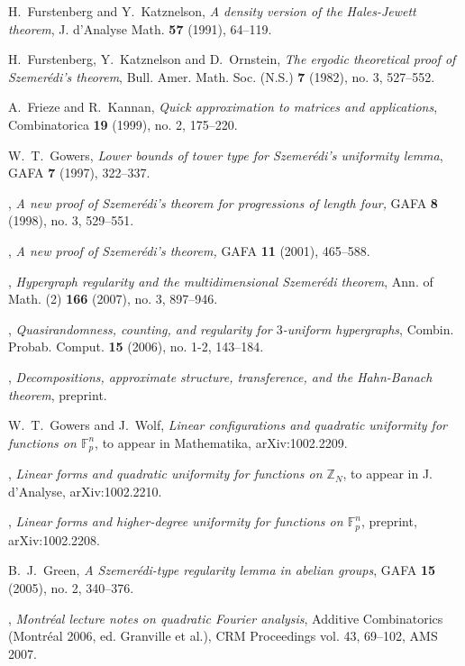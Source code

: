 \documentclass[11pt,reqno]{amsart}
\numberwithin{equation}{section}
\theoremstyle{plain}
\theoremstyle{definition}
\newcommand\F{\mathbb{F}}
\newcommand\1{{\bf 1}}
\newcommand\2{{\bf 2}}
\begin{document}
\begin{thebibliography}{99}
H.~Furstenberg and Y.~Katznelson, \emph{A density version of the Hales-Jewett theorem}, J. d'Analyse Math. \textbf{57} (1991), 64--119.

 H.~Furstenberg, Y.~Katznelson and D.~Ornstein,
\emph{The ergodic theoretical proof of Szemer\'edi's theorem},
Bull. Amer. Math. Soc. (N.S.) \textbf{7} (1982), no. 3, 527--552.

A.~Frieze and R.~Kannan, \emph{Quick approximation to matrices
and applications}, Combinatorica \textbf{19} (1999), no. 2,
175--220.

W.~T.~Gowers, \emph{Lower bounds of tower type for Szemer\'edi's uniformity lemma}, GAFA \textbf{7} (1997), 322--337.

\bysame, \emph{A new proof of Szemer\'edi's theorem for progressions of length four,} GAFA \textbf{8} (1998), 
no. 3, 529--551.

\bysame, \emph{A new proof of Szemer\'edi's theorem,} GAFA \textbf{11} (2001), 465--588. 

\bysame, \emph{Hypergraph regularity and the multidimensional Szemer\'edi theorem}, Ann. of Math. (2) \textbf{166} (2007), no. 3, 897--946.

\bysame, \emph{Quasirandomness, counting, and regularity for $3$-uniform hypergraphs}, Combin. Probab. Comput. \textbf{15} (2006), no. 1-2, 143--184.

\bysame, \emph{Decompositions, approximate structure, transference, and the Hahn-Banach theorem}, preprint.

W.~T.~Gowers and J.~Wolf, \emph{Linear configurations and quadratic uniformity for functions on $\F_p^n$}, to appear in Mathematika, arXiv:1002.2209.

\bysame, \emph{Linear forms and quadratic uniformity for functions on $\mathbb{Z}_N$}, to appear in J. d'Analyse, arXiv:1002.2210.

\bysame, \emph{Linear forms and higher-degree uniformity for functions on $\mathbb{F}_p^n$}, preprint, arXiv:1002.2208.

B.~J.~Green, \emph{A Szemer\'edi-type regularity lemma in abelian groups}, GAFA \textbf{15} (2005), no. 2, 340--376.

\bysame, \emph{Montr\'eal lecture notes on quadratic Fourier analysis}, Additive Combinatorics (Montr\'eal 2006, ed. Granville et al.), CRM Proceedings vol. 43, 69--102, AMS 2007.


\end{thebibliography}
\end{document}
